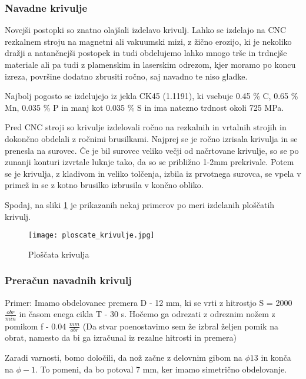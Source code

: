 \subsubsection{Navadne krivulje}
Novejši postopki so znatno olajšali izdelavo krivulj.
Lahko se izdelajo na CNC rezkalnem stroju na magnetni ali vakuumski mizi,
z žično erozijo, ki je nekoliko dražji a natančnejši postopek in tudi
obdelujemo lahko mnogo trše in trdnejše materiale ali pa tudi z
plamenskim in laserskim odrezom, kjer moramo po koncu izreza, površine
dodatno zbrusiti ročno, saj navadno te niso gladke.

Najbolj pogosto se izdelujejo iz jekla CK45 (1.1191), ki vsebuje
0.45 \% C, 0.65 \% Mn, 0.035 \% P in manj kot 0.035 \% S in ima natezno trdnost okoli 725 MPa. \cite{interna}

Pred CNC stroji so krivulje izdelovali ročno na rezkalnih in vrtalnih strojih
in dokončno obdelali z ročnimi brusilkami.
Najprej se je ročno izrisala krivulja in se prenesla na surovec.
Če je bil surovec veliko večji od načrtovane krivulje, so se po
zunanji konturi izvrtale luknje tako, da so se približno 1-2mm
prekrivale. Potem se je krivulja, z kladivom in veliko tolčenja, izbila iz prvotnega surovca,
se vpela v primež in se z kotno brusilko izbrusila v končno obliko.

Spodaj, na sliki \ref{ploscate_krivulje} je prikazanih nekaj primerov
po meri izdelanih ploščatih krivulj.

\begin{figure}[H]
	\begin{center}
		\texttt{[image: ploscate\_krivulje.jpg]}
		\caption{Ploščata krivulja
			\cite{lasten}}
		\label{ploscate_krivulje}
	\end{center}
\end{figure}

\subsubsection{Preračun navadnih krivulj}
\label{izracun_krivulj}
Primer: Imamo obdelovanec premera D - 12 mm, ki se vrti z hitrostjo S = 2000 \( \frac{obr}{min} \)
in časom enega cikla T - 30 s. Hočemo ga odrezati z odreznim nožem z pomikom f - 0.04 \( \frac{mm}{obr} \)
(Da stvar poenostavimo sem že izbral željen pomik na obrat, namesto da bi ga
izračunal iz rezalne hitrosti in premera)

Zaradi varnosti, bomo določili, da nož začne z delovnim gibom
na $\phi13$ in konča na $\phi-1$. To pomeni, da bo potoval 7 mm, ker
imamo simetrično obdelovanje.

